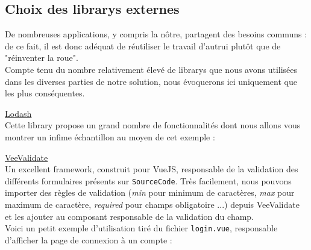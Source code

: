 \subsection*{Choix des \glspl{library} externes}

De nombreuses applications, y compris la nôtre, partagent des besoins communs : de ce fait, il est donc adéquat de réutiliser le travail d'autrui plutôt que de "réinventer la roue". \\

Compte tenu du nombre relativement élevé de \glspl{library} que nous avons utilisées dans les diverses parties de notre solution, nous évoquerons ici uniquement que les plus conséquentes. \\



\underline{\href{https://lodash.com/}{Lodash}}\\

Cette \gls{library} propose un grand nombre de fonctionnalités dont nous allons vous montrer un infime échantillon au moyen de cet exemple :



\pagebreak
{}

\noindent\underline{\href{https://logaretm.github.io/vee-validate/}{VeeValidate}}\\

Un excellent framework, construit pour VueJS, responsable de la validation des différents formulaires présents sur \texttt{SourceCode}. Très facilement, nous pouvons importer des règles de validation (\textit{min} pour minimum de caractères, \textit{max} pour maximum de caractère, \textit{required} pour champs obligatoire ...) depuis VeeValidate et les ajouter au composant responsable de la validation du champ.\\

Voici un petit exemple d'utilisation tiré du fichier \texttt{login.vue}, responsable d'afficher la page de connexion à un compte :\\

